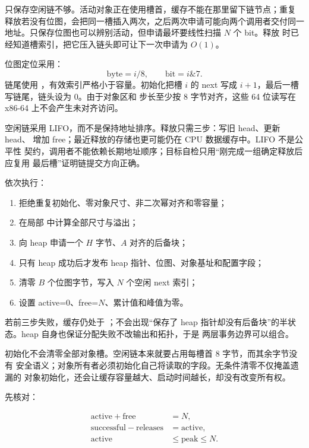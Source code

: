 只保存空闲链不够。活动对象正在使用槽首，缓存不能在那里留下链节点；重复
释放若没有位图，会把同一槽插入两次，之后两次申请可能向两个调用者交付同一
地址。只保存位图也可以辨别活动，但申请最坏要线性扫描 \(N\) 个 bit。释放
时已经知道槽索引，把它压入链头即可让下一次申请为 \(O(1)\)。

位图定位采用：
\[
  \mathrm{byte}=i/8,\qquad
  \mathrm{bit}=i\mathbin{\&}7.
\]
链尾使用 ，有效索引严格小于容量。初始化把槽
\(i\) 的 next 写成 \(i+1\)，最后一槽写链尾，链头设为 0。由于对象区和
步长至少按 8 字节对齐，这些 64 位读写在 x86-64 上不会产生未对齐访问。

空闲链采用 LIFO，而不是保持地址排序。释放只需三步：写旧 head、更新 head、
增加 free；最近释放的存储也更可能仍在 CPU 数据缓存中。LIFO 不是公平性
契约，调用者不能依赖长期地址顺序；目标自检只用“刚完成一组确定释放后应复用
最后槽”证明链提交方向正确。

 依次执行：

\begin{enumerate}[label=\arabic*.]
  \item 拒绝重复初始化、零对象尺寸、非二次幂对齐和零容量；
  \item 在局部  中计算全部尺寸与溢出；
  \item 向 heap 申请一个 \(H\) 字节、\(A\) 对齐的后备块；
  \item 只有 heap 成功后才发布 heap 指针、位图、对象基址和配置字段；
  \item 清零 \(B\) 个位图字节，写入 \(N\) 个空闲 next 索引；
  \item 设置 active=0、free=\(N\)、累计值和峰值为零。
\end{enumerate}

若前三步失败，缓存仍处于 ；不会出现“保存了 heap
指针却没有后备块”的半状态。heap 自身也保证分配失败不改输出和拓扑，于是
两层事务边界可以组合。

初始化不会清零全部对象槽。空闲链本来就要占用每槽首 8 字节，而其余字节没有
安全语义；对象所有者必须初始化自己将读取的字段。无条件清零不仅掩盖遗漏的
对象初始化，还会让缓存容量越大、启动时间越长，却没有改变所有权。

 先核对：

\[
\begin{aligned}
\mathrm{active}+\mathrm{free}&=N,\\
\mathrm{successful}-\mathrm{releases}&=\mathrm{active},\\
\mathrm{active}&\le\mathrm{peak}\le N.
\end{aligned}
\]


